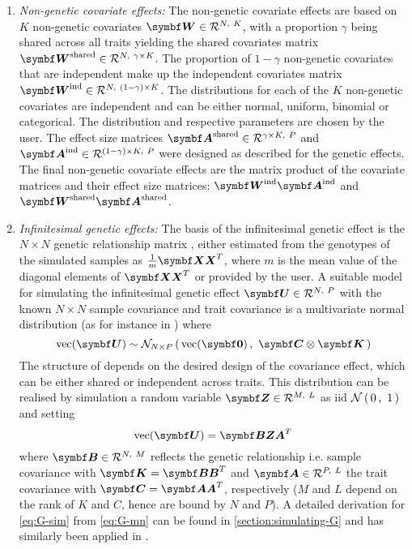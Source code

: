 \begin{enumerate}
\item \textit{Non-genetic covariate effects:} The non-genetic covariate effects are based on \(K\) non-genetic covariates \(\mat{W} \inR N K\), with a proportion \(\gamma\) being shared across all traits yielding the shared covariates matrix \(\matsup{W}{shared} \inR N {\gamma \times K} \). The proportion of \(1- \gamma\) non-genetic covariates that are independent make up the independent covariates matrix \(\matsup{W}{ind} \inR N {(1-\gamma) \times K}\). The distributions for each of the \(K\)  non-genetic covariates are independent and can be either normal, uniform, binomial or categorical. The distribution and respective parameters are chosen by the user. The effect size matrices  \(\matsup{A}{shared} \inR {\gamma \times K} P\)  and \(\matsup{A}{ind}  \inR {(1-\gamma) \times K} P \) were designed as described for the genetic effects. The final non-genetic covariate effects are the matrix product of the covariate matrices and their effect size matrices: \(\matsup{W}{ind}\matsup{A}{ind}\) and \(\matsup{W}{shared}\matsup{A}{shared}\).

\item \textit{Infinitesimal genetic effects:} The basis of the infinitesimal genetic effect  is the \(N \times N\) genetic relationship matrix , either estimated from the genotypes of the simulated samples as \(\frac{1}{m}\mat{XX}^T\), where \(m\) is the mean value of the diagonal elements of  \(\mat{XX}^T\) or provided by the user. A suitable model for simulating the infinitesimal genetic effect \(\mat{U} \inR N P\) with the known  \(N \times N\) sample covariance  and trait covariance  is a multivariate normal distribution (as for instance in \citep{Zhou2014,Casale2015}) where
%
\begin{equation}
 \text{vec}(\mat{U}) \sim \multinormal N P {\text{vec}(\mat{0})} {\mat{C} \otimes \mat{K}}
 \label{eq:G-mn}
\end{equation}
%
The structure of  depends on the desired design of the covariance effect, which can be either shared or independent across traits. This distribution can be realised by simulation a random variable \(\mat{Z} \inR M L\) as iid \(\mathcal{N}\left(\,{0}\,,~{1}\,\right)\) and setting 
\begin{equation}
 \text{vec}(\mat{U}) = \mat{BZA}^T
 \label{eq:G-sim}
\end{equation}
where \(\mat{B} \inR N M\) reflects the genetic relationship i.e. sample covariance with \(\mat{K}=\mat{BB}^T\) and \(\mat{A} \inR P L\) the trait covariance with  \(\mat{C}=\mat{AA}^T\), respectively (\(M\) and \(L\) depend on the rank of \(K\) and \(C\), hence are bound by \(N\) and \(P\)).  A detailed derivation for \cref{eq:G-sim} from \cref{eq:G-mn} can be found in \cref{section:simulating-G} and has similarly been applied in \citep{Casale2015}.


\end{enumerate}

